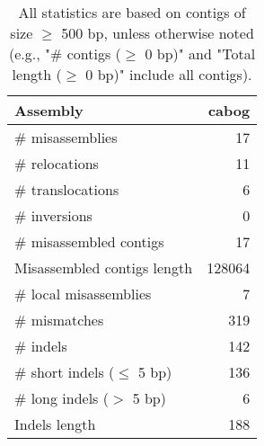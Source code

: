 \documentclass[12pt,a4paper]{article}
\begin{document}
\begin{table}[ht]
\begin{center}
\caption{All statistics are based on contigs of size $\geq$ 500 bp, unless otherwise noted (e.g., "\# contigs ($\geq$ 0 bp)" and "Total length ($\geq$ 0 bp)" include all contigs).}
\begin{tabular}{|l*{1}{|r}|}
\hline
Assembly & cabog \\ \hline
\# misassemblies & 17 \\ \hline
\hspace{5mm}\# relocations & 11 \\ \hline
\hspace{5mm}\# translocations & 6 \\ \hline
\hspace{5mm}\# inversions & 0 \\ \hline
\# misassembled contigs & 17 \\ \hline
Misassembled contigs length & 128064 \\ \hline
\# local misassemblies & 7 \\ \hline
\# mismatches & 319 \\ \hline
\# indels & 142 \\ \hline
\hspace{5mm}\# short indels ($\leq$ 5 bp) & 136 \\ \hline
\hspace{5mm}\# long indels ($>$ 5 bp) & 6 \\ \hline
Indels length & 188 \\ \hline
\end{tabular}
\end{center}
\end{table}
\end{document}
